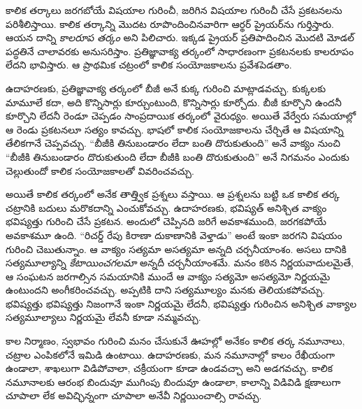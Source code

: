 \documentclass[../../../include/open-logic-section]{subfiles}
\begin{document}


కాలిక తర్కాలు జరగబోయే విషయాల గురించీ, జరిగిన విషయాల
గురించీ చేసే ప్రకటనలను పరిశీలిస్తాయి. కాలిక తర్కాన్ని మొదట
రూపొందించినవారిగా ఆర్థర్ ప్రైయర్‌ను గుర్తిస్తారు. ఆయన దాన్ని
\emph{కాలరూప తర్కం} అని పిలిచారు. ఇక్కడ ప్రైయర్ ప్రతిపాదించిన
మొదటి మోడల్ పద్ధతినే చాలావరకు అనుసరిస్తాం. ప్రతిజ్ఞావాక్య తర్కంలో
సాధారణంగా ప్రకటనలకు కాలరూపం లేదని భావిస్తారు. ఆ ప్రాథమిక
చట్రంలో కాలిక సంయోజకాలను ప్రవేశపెడతాం.

ఉదాహరణకు, ప్రతిజ్ఞావాక్య తర్కంలో బీజీ అనే కుక్క గురించి
మాట్లాడవచ్చు. కుక్కలకు మామూలే కదా, అది కొన్నిసార్లు
కూర్చుంటుంది, కొన్నిసార్లు కూర్చోదు. బీజీ కూర్చొని ఉందనీ
కూర్చొని లేదనీ రెండూ చెప్పడం సాంప్రదాయిక తర్కంలో వైరుధ్యం.
అయితే వేర్వేరు సమయాల్లో ఆ రెండు ప్రకటనలూ సత్యం కావచ్చు. భాషలో
కాలిక సంయోజకాలను చేర్చితే ఆ విషయాన్ని తేలికగానే చెప్పవచ్చు. ``బీజీకి తినుబండారం
లేదా బంతి దొరుకుతుంది'' అనే వాక్యం నుంచి ``బీజీకి
తినుబండారం దొరుకుతుంది లేదా బీజీకి బంతి దొరుకుతుంది''
అనే నిగమనం ఎందుకు చెల్లుతుందో కాలిక సంయోజకాలతో వివరించవచ్చు.

అయితే కాలిక తర్కంలో అనేక తాత్త్విక ప్రశ్నలు వస్తాయి.
ఆ ప్రశ్నలను బట్టి ఒక కాలిక తర్క చట్రానికి బదులు మరొకదాన్ని
ఎంచుకోవచ్చు. ఉదాహరణకు, భవిష్యత్ అనిశ్చిత వాక్యం భవిష్యత్తు
గురించి చేసే ప్రకటన. అందులో చెప్పినది జరిగే అవకాశముంది,
జరగకపోయే అవకాశమూ ఉంది. ``రిచర్డ్ రేపు కిరాణా దుకాణానికి
వెళ్తాడు'' అంటే ఇంకా జరగని విషయం గురించి చెబుతున్నాం.
ఆ వాక్యం సత్యమా అసత్యమా అన్నది చర్చనీయాంశం. అసలు దానికి
సత్యమూల్యాన్ని \emph{కేటాయించగలమా} అన్నదీ చర్చనీయాంశమే.
మనం కఠిన నిర్ణయవాదులమైతే, ఆ సంఘటన జరగాల్సిన సమయానికి ముందే
ఆ వాక్యం సత్యమో అసత్యమో నిర్ణయమై ఉంటుందని అంగీకరించవచ్చు.
అప్పటికి దాని సత్యమూల్యం మనకు తెలియకపోవచ్చు. భవిష్యత్తు
భవిష్యత్తు నిజంగానే ఇంకా నిర్ణయమై లేదనీ, భవిష్యత్తు గురించిన అనిశ్చిత
వాక్యాల సత్యమూల్యాలు నిర్ణయమై లేవనీ కూడా నమ్మవచ్చు.

కాల నిర్మాణం, స్వభావం గురించి మనం చేసుకునే ఊహల్లో అనేకం
కాలిక తర్క నమూనాలు, చట్రాల ఎంపికలోనే ఇమిడి ఉంటాయి.
ఉదాహరణకు, మన నమూనాల్లో కాలం రేఖీయంగా ఉండాలా, శాఖలుగా
విడిపోవాలా, చక్రీయంగా కూడా ఉండవచ్చా అని అడగవచ్చు.
కాలిక నమూనాలకు ఆరంభ బిందువూ ముగింపు బిందువూ ఉండాలా,
కాలాన్ని విడివిడి క్షణాలుగా చూపాలా లేక అవిచ్ఛిన్నంగా
చూపాలా అనేవీ నిర్ణయించాల్సి రావచ్చు.
\end{document}
